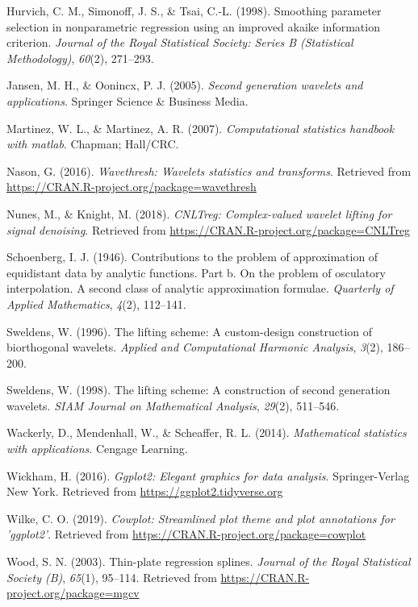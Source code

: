 \documentclass[12pt,twoside, a4paper]{reedthesis}
\begin{document}
\leavevmode\hypertarget{ref-hurvich1998smoothing}{}%
Hurvich, C. M., Simonoff, J. S., \& Tsai, C.-L. (1998). Smoothing parameter selection in nonparametric regression using an improved akaike information criterion. \emph{Journal of the Royal Statistical Society: Series B (Statistical Methodology)}, \emph{60}(2), 271--293.

\leavevmode\hypertarget{ref-jansen2005second}{}%
Jansen, M. H., \& Oonincx, P. J. (2005). \emph{Second generation wavelets and applications}. Springer Science \& Business Media.

\leavevmode\hypertarget{ref-martinez2007computational}{}%
Martinez, W. L., \& Martinez, A. R. (2007). \emph{Computational statistics handbook with matlab}. Chapman; Hall/CRC.

\leavevmode\hypertarget{ref-wavethresh}{}%
Nason, G. (2016). \emph{Wavethresh: Wavelets statistics and transforms}. Retrieved from \url{https://CRAN.R-project.org/package=wavethresh}

\leavevmode\hypertarget{ref-CNLT}{}%
Nunes, M., \& Knight, M. (2018). \emph{CNLTreg: Complex-valued wavelet lifting for signal denoising}. Retrieved from \url{https://CRAN.R-project.org/package=CNLTreg}

\leavevmode\hypertarget{ref-schoenberg1946contributions}{}%
Schoenberg, I. J. (1946). Contributions to the problem of approximation of equidistant data by analytic functions. Part b. On the problem of osculatory interpolation. A second class of analytic approximation formulae. \emph{Quarterly of Applied Mathematics}, \emph{4}(2), 112--141.

\leavevmode\hypertarget{ref-sweldens1996lifting}{}%
Sweldens, W. (1996). The lifting scheme: A custom-design construction of biorthogonal wavelets. \emph{Applied and Computational Harmonic Analysis}, \emph{3}(2), 186--200.

\leavevmode\hypertarget{ref-sweldens1998lifting}{}%
Sweldens, W. (1998). The lifting scheme: A construction of second generation wavelets. \emph{SIAM Journal on Mathematical Analysis}, \emph{29}(2), 511--546.

\leavevmode\hypertarget{ref-wackerly2014mathematical}{}%
Wackerly, D., Mendenhall, W., \& Scheaffer, R. L. (2014). \emph{Mathematical statistics with applications}. Cengage Learning.

\leavevmode\hypertarget{ref-wickham2016ggplot2}{}%
Wickham, H. (2016). \emph{Ggplot2: Elegant graphics for data analysis}. Springer-Verlag New York. Retrieved from \url{https://ggplot2.tidyverse.org}

\leavevmode\hypertarget{ref-cowplot}{}%
Wilke, C. O. (2019). \emph{Cowplot: Streamlined plot theme and plot annotations for 'ggplot2'}. Retrieved from \url{https://CRAN.R-project.org/package=cowplot}

\leavevmode\hypertarget{ref-spline}{}%
Wood, S. N. (2003). Thin-plate regression splines. \emph{Journal of the Royal Statistical Society (B)}, \emph{65}(1), 95--114. Retrieved from \url{https://CRAN.R-project.org/package=mgcv}


\end{document}

